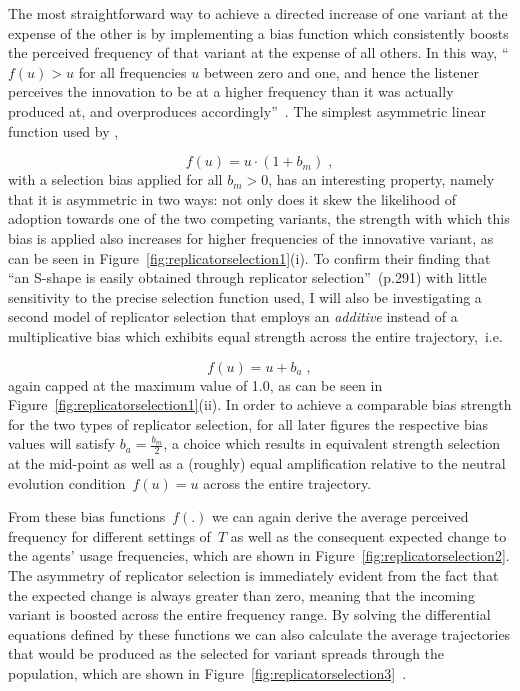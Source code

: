 The most straightforward way to achieve a directed increase of one variant at the expense of the other is by implementing a bias function which consistently boosts the perceived frequency of that variant at the expense of all others. In this way, ``$f(u)>u$ for all frequencies $u$ between zero and one, and hence the listener perceives the innovation to be at a higher frequency than it was actually produced at, and overproduces accordingly''~\citep[p.291]{Blythe2012}. The simplest asymmetric linear function used by \citeauthor{Blythe2012},

\begin{equation}\label{eq:usmmultiplicative}
f(u) = u\cdot(1+b_m)\;,
\end{equation}
with a selection bias applied for all $b_m>0$, has an interesting property, namely that it is asymmetric in two ways: not only does it skew the likelihood of adoption towards one of the two competing variants, the strength with which this bias is applied also increases for higher frequencies of the innovative variant, as can be seen in Figure~\ref{fig:replicatorselection1}(i).
To confirm their finding that ``an S-shape is easily obtained through replicator selection''~(p.291) with little sensitivity to the precise selection function used, I will also be investigating a second model of replicator selection that employs an \emph{additive} instead of a multiplicative bias which exhibits equal strength across the entire trajectory,~i.e.

\begin{equation}\label{eq:usmadditive}
f(u)=u+b_a\;,
\end{equation}
again capped at the maximum value of 1.0, as can be seen in Figure~\ref{fig:replicatorselection1}(ii).
In order to achieve a comparable bias strength for the two types of replicator selection, for all later figures the respective bias values  will satisfy $b_a=\frac{b_m}{2}$, a choice which results in equivalent strength selection at the mid-point as well as a (roughly) equal amplification relative to the neutral evolution condition~$f(u)=u$ across the entire trajectory.

From these bias functions~$f(.)$ we can again derive the average perceived frequency for different settings of~$T$ as well as the consequent expected change to the agents' usage frequencies, which are shown in Figure~\ref{fig:replicatorselection2}. The asymmetry of replicator selection is immediately evident from the fact that the expected change is always greater than zero, meaning that the incoming variant is boosted across the entire frequency range.
By solving the differential equations defined by these functions we can also calculate the average trajectories that would be produced as the selected for variant spreads through the population, which are shown in Figure~\ref{fig:replicatorselection3}~\citep[for an in-depth explanation of the approach see the appendix to][mathematical derivations of the results for both models of replicator selection are provided in Appendix~\ref{app:usm}]{Blythe2012}.


